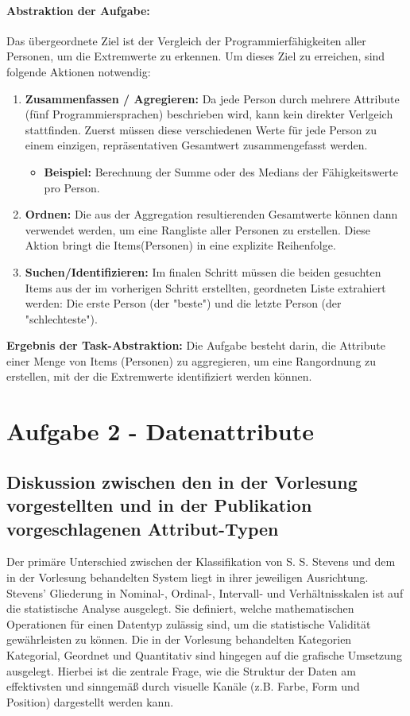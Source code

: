 \documentclass[12pt, a4paper]{article}
\begin{document}
\paragraph{Abstraktion der Aufgabe:}
Das übergeordnete Ziel ist der Vergleich der Programmierfähigkeiten aller Personen, um die Extremwerte zu erkennen.
Um dieses Ziel zu erreichen, sind folgende Aktionen notwendig:
\begin{enumerate}
  \item \textbf{Zusammenfassen / Agregieren:}
    Da jede Person durch mehrere Attribute (fünf Programmiersprachen) beschrieben wird, kann kein direkter Verlgeich stattfinden. Zuerst müssen diese verschiedenen Werte
    für jede Person zu einem einzigen, repräsentativen Gesamtwert zusammengefasst werden.
      \begin{itemize}
        \item \textbf{Beispiel:} Berechnung der Summe oder des Medians der Fähigkeitswerte pro Person.
      \end{itemize}
  \item \textbf{Ordnen:} Die aus der Aggregation resultierenden Gesamtwerte können dann verwendet werden, um eine Rangliste aller Personen zu erstellen. Diese Aktion bringt
    die Items(Personen) in eine explizite Reihenfolge.
  \item \textbf{Suchen/Identifizieren:} Im finalen Schritt müssen die beiden gesuchten Items aus der im vorherigen Schritt erstellten, geordneten Liste extrahiert werden:
    Die erste Person (der "beste") und die letzte Person (der "schlechteste").
\end{enumerate}


\vspace{1em}
\textbf{Ergebnis der Task-Abstraktion:} Die Aufgabe besteht darin, die Attribute einer Menge von Items (Personen) zu aggregieren,
um eine Rangordnung zu erstellen, mit der die Extremwerte identifiziert werden können.



\section*{Aufgabe 2 - Datenattribute}
\subsection*{Diskussion zwischen den in der Vorlesung vorgestellten und in der Publikation vorgeschlagenen Attribut-Typen}
Der primäre Unterschied zwischen der Klassifikation von S. S. Stevens und dem in der Vorlesung behandelten System liegt in ihrer jeweiligen Ausrichtung.
Stevens' Gliederung in Nominal-, Ordinal-, Intervall- und Verhältnisskalen ist auf die statistische Analyse ausgelegt.
Sie definiert, welche mathematischen Operationen für einen Datentyp zulässig sind, um die statistische Validität gewährleisten zu können.
Die in der Vorlesung behandelten Kategorien Kategorial, Geordnet und Quantitativ sind hingegen auf die grafische Umsetzung ausgelegt. 
Hierbei ist die zentrale Frage, wie die Struktur der Daten am effektivsten und sinngemäß durch visuelle Kanäle (z.B. Farbe, Form und Position) dargestellt werden kann.
\end{document}
